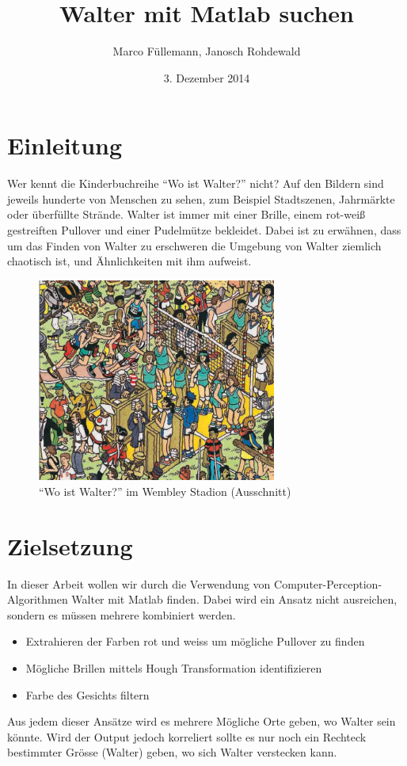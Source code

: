 \documentclass[paper=a4,fontsize=12pt]{scrartcl}
\begin{document}
\title{Walter mit Matlab suchen}
\author{Marco Füllemann, Janosch Rohdewald}
\date{3. Dezember 2014}
\maketitle
\section*{Einleitung}
Wer kennt die Kinderbuchreihe ``Wo ist Walter?'' nicht? Auf den Bildern sind jeweils hunderte von Menschen zu sehen, zum Beispiel Stadtszenen, Jahrmärkte oder überfüllte Strände. Walter ist immer mit einer Brille, einem rot-weiß gestreiften Pullover und einer Pudelmütze bekleidet. Dabei ist zu erwähnen, dass um das Finden von Walter zu erschweren die Umgebung von Walter ziemlich chaotisch ist, und Ähnlichkeiten mit ihm aufweist. 
\begin{figure}[htbp] 
  \centering
     \includegraphics[width=0.7\textwidth]{img/Wally.png}
  \caption{``Wo ist Walter?'' im Wembley Stadion (Ausschnitt)}
  \label{fig:Bild1}
\end{figure}
\section*{Zielsetzung}
In dieser Arbeit wollen wir durch die Verwendung von Computer-Perception-Algorithmen Walter mit Matlab finden. Dabei wird ein Ansatz nicht ausreichen, sondern es müssen mehrere kombiniert werden.
\begin{itemize}
 \item Extrahieren der Farben rot und weiss um mögliche Pullover zu finden
 \item Mögliche Brillen mittels Hough Transformation identifizieren
 \item Farbe des Gesichts filtern
\end{itemize}
Aus jedem dieser Ansätze wird es mehrere Mögliche Orte geben, wo Walter sein könnte. Wird der Output jedoch korreliert sollte es nur noch ein Rechteck bestimmter Grösse (Walter) geben, wo sich Walter verstecken kann. 
\end{document}
